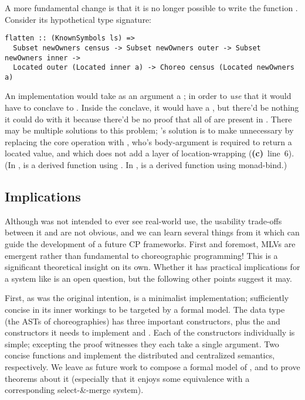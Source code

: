 A more fundamental change is that it is no longer possible to write the function .
Consider its hypothetical type signature:
\begin{verbatim}
flatten :: (KnownSymbols ls) =>
  Subset newOwners census -> Subset newOwners outer -> Subset newOwners inner ->
  Located outer (Located inner a) -> Choreo census (Located newOwners a)
\end{verbatim}
An implementation would take as an argument a ;
in order to \emph{use} that it would have to conclave to .
Inside the conclave, it would have a ,
but there'd be nothing it could do with it because there'd be no proof that all of  are present in .
There may be multiple solutions to this problem; \minichor's solution is to make  unnecessary
by replacing the core operation  with ,
who's body-argument is required to return a located value, and which does not add a layer of location-wrapping
(\textbf{(c)}~line~6).
(In \MultiChor,  is a derived function using .
In \minichor,  is a derived function using monad-bind.)


\subsection{Implications}
\label{sec:minichor-implications}
Although \minichor was not intended to ever see real-world use,
the usability trade-offs between it and \MultiChor are not obvious,
and we can learn several things from it which can guide the development of a future CP frameworks.
First and foremost, MLVs are emergent rather than fundamental to choreographic programming!
This is a significant theoretical insight on its own.
Whether it has practical implications for a system like \MultiChor is an open question,
but the following other points suggest it may.

First, as was the original intention, \minichor is a minimalist implementation;
sufficiently concise in its inner workings to be targeted by a formal model.
The  data type (the ASTs of choreographies) has three important constructors,
plus the  and  constructors it needs to implement  and .
Each of the constructors individually is simple;
excepting the proof witnesses they each take a single argument.
Two concise functions  and  implement the distributed and centralized semantics, respectively.
We leave as future work to compose a formal model of \minichor,
and to prove theorems about it
(especially that it enjoys some equivalence with a corresponding select-\&-merge system).
 
